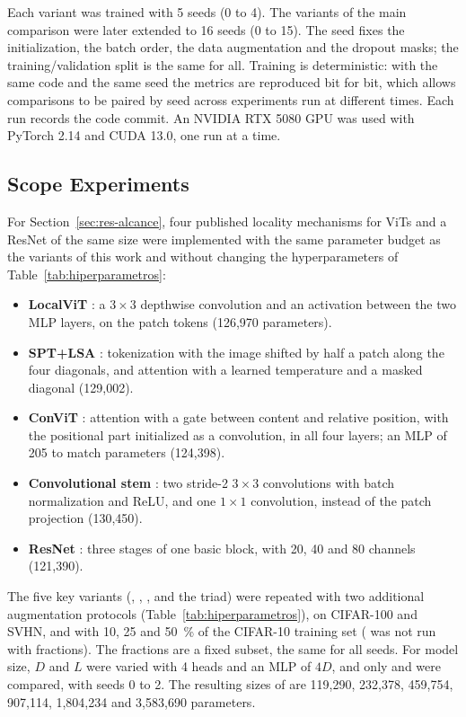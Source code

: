 Each variant was trained with 5 seeds (0 to 4). The variants of the main comparison were later extended to 16 seeds (0 to 15). The seed fixes the initialization, the batch order, the data augmentation and the dropout masks; the training/validation split is the same for all. Training is deterministic: with the same code and the same seed the metrics are reproduced bit for bit, which allows comparisons to be paired by seed across experiments run at different times. Each run records the code commit. An NVIDIA RTX 5080 GPU was used with PyTorch 2.14 and CUDA 13.0, one run at a time.

\subsection{Scope Experiments}
\label{sec:diseno-alcance}
For Section~\ref{sec:res-alcance}, four published locality mechanisms for ViTs and a ResNet of the same size were implemented with the same parameter budget as the variants of this work and without changing the hyperparameters of Table~\ref{tab:hiperparametros}:
\begin{itemize}
  \item \textbf{LocalViT} \citep{li2021localvit}: a $3\times3$ depthwise convolution and an activation between the two MLP layers, on the patch tokens (126,970 parameters).
  \item \textbf{SPT+LSA} \citep{lee2021vision}: tokenization with the image shifted by half a patch along the four diagonals, and attention with a learned temperature and a masked diagonal (129,002).
  \item \textbf{ConViT} \citep{dascoli2021convit}: attention with a gate between content and relative position, with the positional part initialized as a convolution, in all four layers; an MLP of 205 to match parameters (124,398).
  \item \textbf{Convolutional stem} \citep{xiao2021early}: two stride-2 $3\times3$ convolutions with batch normalization and ReLU, and one $1\times1$ convolution, instead of the patch projection (130,450).
  \item \textbf{ResNet} \citep{he2016deep}: three stages of one basic block, with 20, 40 and 80 channels (121,390).
\end{itemize}
The five key variants (, , ,  and the triad) were repeated with two additional augmentation protocols (Table~\ref{tab:hiperparametros}), on CIFAR-100 and SVHN, and with 10, 25 and 50~\% of the CIFAR-10 training set ( was not run with fractions). The fractions are a fixed subset, the same for all seeds. For model size, $D$ and $L$ were varied with 4 heads and an MLP of $4D$, and only  and  were compared, with seeds 0 to 2. The resulting sizes of  are 119,290, 232,378, 459,754, 907,114, 1,804,234 and 3,583,690 parameters.


